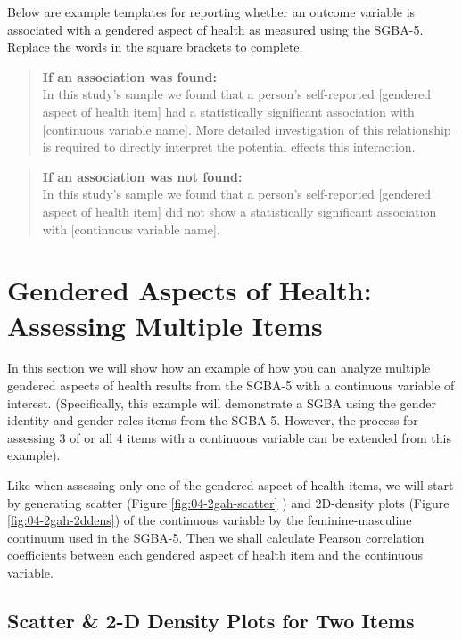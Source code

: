 \documentclass[
]{book}
\begin{document}
Below are example templates for reporting whether an outcome variable is associated with a gendered aspect of health as measured using the SGBA-5. Replace the words in the square brackets to complete.

\begin{quote}
\textbf{If an association was found:}\\
In this study's sample we found that a person's self-reported {[}gendered aspect of health item{]} had a statistically significant association with {[}continuous variable name{]}. More detailed investigation of this relationship is required to directly interpret the potential effects this interaction.
\end{quote}

\begin{quote}
\textbf{If an association was not found:}\\
In this study's sample we found that a person's self-reported {[}gendered aspect of health item{]} did not show a statistically significant association with {[}continuous variable name{]}.
\end{quote}

\section{Gendered Aspects of Health: Assessing Multiple Items}\label{gendered-aspects-of-health-assessing-multiple-items}

In this section we will show how an example of how you can analyze multiple gendered aspects of health results from the SGBA-5 with a continuous variable of interest. (Specifically, this example will demonstrate a SGBA using the gender identity and gender roles items from the SGBA-5. However, the process for assessing 3 of or all 4 items with a continuous variable can be extended from this example).

Like when assessing only one of the gendered aspect of health items, we will start by generating scatter (Figure \ref{fig:04-2gah-scatter} ) and 2D-density plots (Figure \ref{fig:04-2gah-2ddens}) of the continuous variable by the feminine-masculine continuum used in the SGBA-5. Then we shall calculate Pearson correlation coefficients between each gendered aspect of health item and the continuous variable.

\subsection{Scatter \& 2-D Density Plots for Two Items}\label{scatter-2-d-density-plots-for-two-items}
\end{document}
